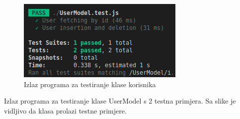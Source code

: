                 \begin{figure}[H]
                    \includegraphics[width=\textwidth]{slike/usermodel_tests_out.png} %
                    \caption{Izlaz programa za testiranje klase korisnika}
                    \label{fig:test2} %
                \end{figure}
                Izlaz programa za testiranje klase UserModel s 2 testna primjera. Sa slike je vidljivo da klasa prolazi testne primjere.

